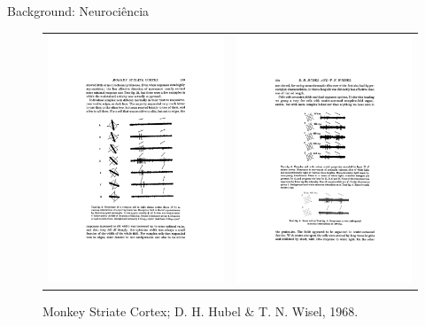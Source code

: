 \documentclass[10pt,xcolor=svgnames]{beamer}
\begin{document}
\begin{frame}{Background: Neurociência}
  \begin{figure}
    \begin{tabular}{cc}
      \includegraphics[width=0.38\linewidth,trim={42mm 65mm 45mm 50mm},clip]{papers/hubel-5.pdf} & \includegraphics[width=0.38\linewidth,trim={42mm 65mm 45mm 50mm},clip]{papers/hubel-10.pdf}
    \end{tabular}
    \caption{Monkey Striate Cortex; D. H. Hubel \& T. N. Wisel, 1968.}
  \end{figure}
\end{frame}
\end{document}
